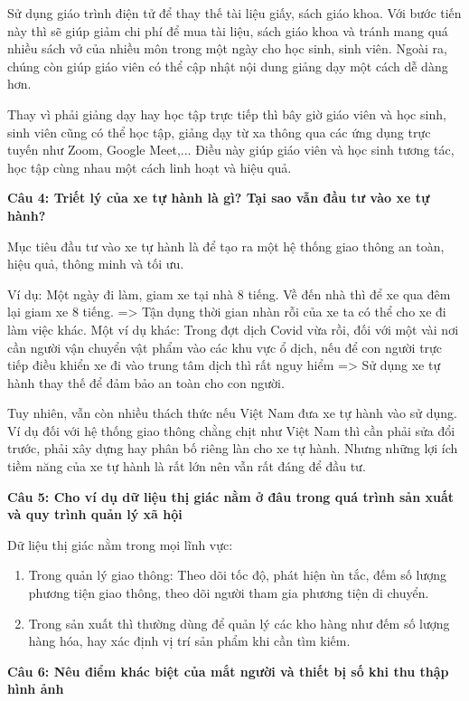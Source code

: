 Sử dụng giáo trình điện tử để thay thế tài liệu giấy, sách giáo khoa. Với bước tiến này thì sẽ giúp giảm chi phí để mua tài liệu, sách giáo khoa và tránh mang quá nhiều sách vở của nhiều môn trong một ngày cho học sinh, sinh viên. Ngoài ra, chúng còn giúp giáo viên có thể cập nhật nội dung giảng dạy một cách dễ dàng hơn.

Thay vì phải giảng dạy hay học tập trực tiếp thì bây giờ giáo viên và học sinh, sinh viên cũng có thể học tập, giảng dạy từ xa thông qua các ứng dụng trực tuyến như Zoom, Google Meet,... Điều này giúp giáo viên và học sinh tương tác, học tập cùng nhau một cách linh hoạt và hiệu quả.

\textbf{Câu 4: Triết lý của xe tự hành là gì? Tại sao vẫn đầu tư vào xe tự hành?}

Mục tiêu đầu tư vào xe tự hành là để tạo ra một hệ thống giao thông an toàn, hiệu quả, thông minh và tối ưu.

Ví dụ: Một ngày đi làm, giam xe tại nhà 8 tiếng. Về đến nhà thì để xe qua đêm lại giam xe 8 tiếng. => Tận dụng thời gian nhàn rỗi của xe ta có thể cho xe đi làm việc khác. Một ví dụ khác: Trong đợt dịch Covid vừa rồi, đối với một vài nơi cần người vận chuyển vật phẩm vào các khu vực ổ dịch, nếu để con người trực tiếp điều khiển xe đi vào trung tâm dịch thì rất nguy hiểm => Sử dụng xe tự hành thay thế để đảm bảo an toàn cho con người.

Tuy nhiên, vẫn còn nhiều thách thức nếu Việt Nam đưa xe tự hành vào sử dụng. Ví dụ đối với hệ thống giao thông chằng chịt như Việt Nam thì cần phải sửa đổi trước, phải xây dựng hay phân bố riêng làn cho xe tự hành. Nhưng những lợi ích tiềm năng của xe tự hành là rất lớn nên vẫn rất đáng để đầu tư.

\textbf{Câu 5: Cho ví dụ dữ liệu thị giác nằm ở đâu trong quá trình sản xuất và quy trình quản lý xã hội}

Dữ liệu thị giác nằm trong mọi lĩnh vực:

\begin{enumerate}
	\item Trong quản lý giao thông: Theo dõi tốc độ, phát hiện ùn tắc, đếm số lượng phương tiện giao thông, theo dõi người tham gia phương tiện di chuyển.
	
	\item Trong sản xuất thì thường dùng để quản lý các kho hàng như đếm số lượng hàng hóa, hay xác định vị trí sản phẩm khi cần tìm kiếm.
\end{enumerate}

\textbf{Câu 6: Nêu điểm khác biệt của mắt người và thiết bị số khi thu thập hình ảnh}

